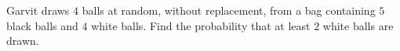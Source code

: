 Garvit draws $4$ balls at random, without replacement, from a bag containing $5$ black balls and $4$ white balls. Find the probability that at least $2$ white balls are drawn.
